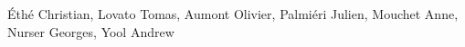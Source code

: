 \'{E}th\'{e} Christian, 
Lovato Tomas, 
Aumont Olivier, 
Palmi\'{e}ri Julien, 
Mouchet Anne, 
Nurser Georges, 
Yool Andrew

